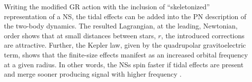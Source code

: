Writing the modified \ac{GR} action with the inclusion of ``skeletonized'' representation
of a \ac{NS}, the tidal effects can be added into the \ac{PN} description of the two-body dynamics.
The resulted Lagrangian, at the leading, Newtonian, order shows that at small distances 
between stars, $r$, the introduced corrections are attractive. 
%
Further, the Kepler law, given by the quadrupolar gravitoelectric term, 
%
%
shows that the finite-size effects manifest as an increased orbital frequency at a given radius.
In other words, the \acp{NS} spin faster if tidal effects are present and merge sooner 
producing signal with higher frequency \citep{Damour:2009wj}. 
%

